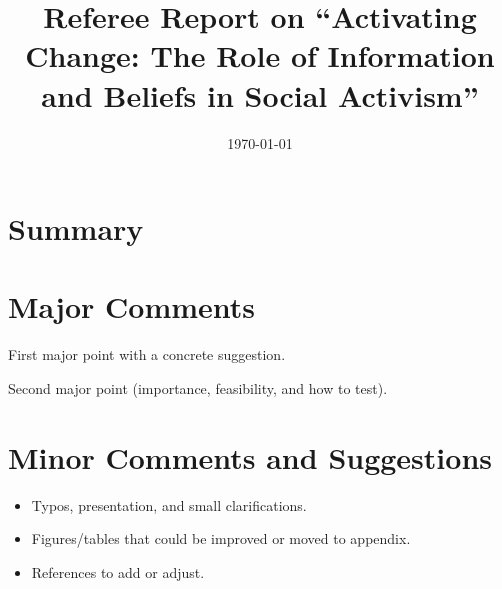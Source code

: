 \documentclass{referee-report}
\title{Referee Report on ``Activating Change: The Role of Information and Beliefs in Social Activism''}
\author{}
\date{\today}
\begin{document}
\maketitle

\section*{Summary}

\section*{Major Comments}
\begin{refcomment}
First major point with a concrete suggestion.
\end{refcomment}

\begin{refcomment}
Second major point (importance, feasibility, and how to test).
\end{refcomment}

\section*{Minor Comments and Suggestions}
\begin{itemize}
  \item Typos, presentation, and small clarifications.
  \item Figures/tables that could be improved or moved to appendix.
  \item References to add or adjust.
\end{itemize}

% 
% 
\end{document}
